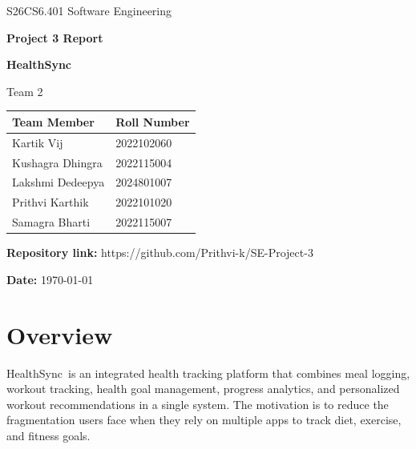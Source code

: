 \documentclass[11pt]{article}
\newcommand{\ProjectName}{HealthSync}
\newcommand{\CourseName}{S26CS6.401 Software Engineering}
\newcommand{\TeamNumber}{2}
\begin{document}
\begin{titlepage}
  \centering
  {\Large \CourseName \par}
  \vspace{0.35cm}
  {\Large \textbf{Project 3 Report} \par}
  \vspace{1.0cm}
  {\huge \textbf{\ProjectName} \par}
  \vspace{0.25cm}
  {\Large Team \TeamNumber \par}
  \vspace{0.8cm}

  \begin{tabular}{@{}ll@{}}
    \toprule
    \textbf{Team Member} & \textbf{Roll Number} \\
    \midrule
    Kartik Vij          & 2022102060 \\
    Kushagra Dhingra    & 2022115004 \\
    Lakshmi Dedeepya    & 2024801007 \\
    Prithvi Karthik     & 2022101020 \\
    Samagra Bharti      & 2022115007 \\
    \bottomrule
  \end{tabular}

  \vfill
  \textbf{Repository link:} https://github.com/Prithvi-k/SE-Project-3 \par
  \vspace{0.35cm}
  \textbf{Date:} \today \par
\end{titlepage}

{\setlength{\parskip}{0pt}\tableofcontents}
\newpage
{}

\section{Overview}

\ProjectName\ is an integrated health tracking platform that combines meal logging, workout tracking,
health goal management, progress analytics, and personalized workout recommendations in a single system.
The motivation is to reduce the fragmentation users face when they rely on multiple apps to track diet,
exercise, and fitness goals.

\end{document}
